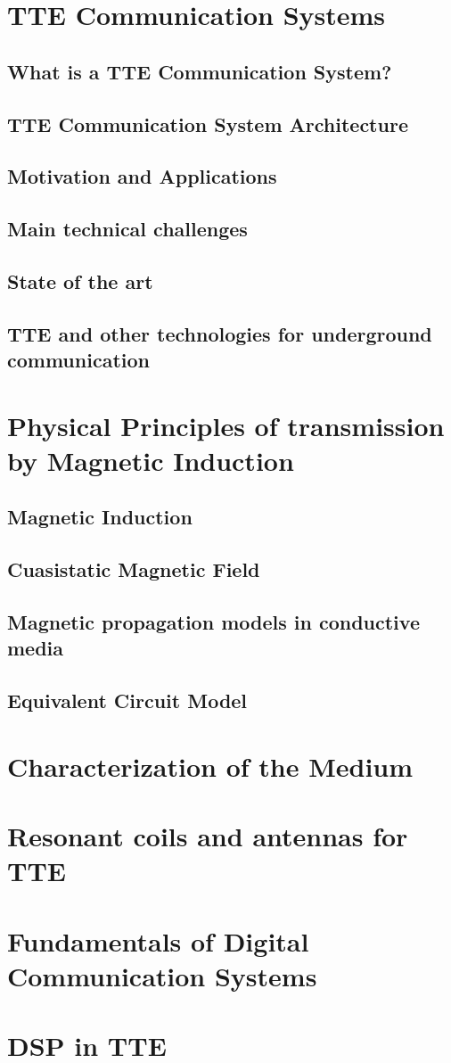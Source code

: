 \section{TTE Communication Systems}
\subsection{What is a TTE Communication System?}
\subsection{TTE Communication System Architecture}
\subsection{Motivation and Applications}
\subsection{Main technical challenges}
\subsection{State of the art}
\subsection{TTE and other technologies for underground communication}
\section{Physical Principles of transmission by Magnetic Induction}
\subsection{Magnetic Induction}
\subsection{Cuasistatic Magnetic Field}
\subsection{Magnetic propagation models in conductive media}
\subsection{Equivalent Circuit Model}
\section{Characterization of the Medium}
\section{Resonant coils and antennas for TTE}
\section{Fundamentals of Digital Communication Systems}
\section{DSP in TTE}
